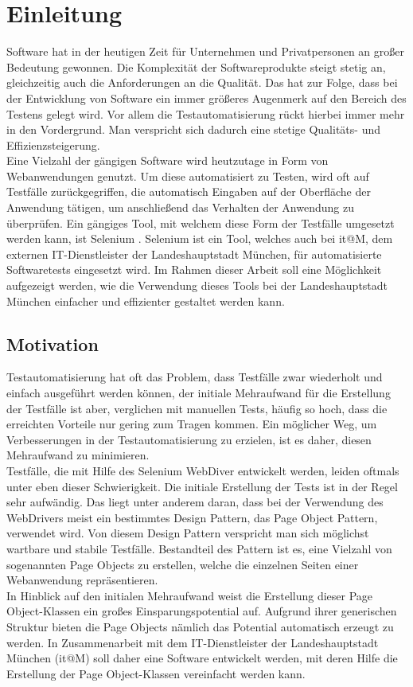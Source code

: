 \chapter{Einleitung}
\label{sec:einleitung}
Software hat in der heutigen Zeit für Unternehmen und Privatpersonen an großer Bedeutung gewonnen.
Die Komplexität der Softwareprodukte steigt stetig an, gleichzeitig auch die Anforderungen an die Qualität.
Das hat zur Folge, dass bei der Entwicklung von Software ein immer größeres Augenmerk auf den Bereich des Testens gelegt wird.
Vor allem die Testautomatisierung rückt hierbei immer mehr in den Vordergrund.
Man verspricht sich dadurch eine stetige Qualitäts- und Effizienzsteigerung.\\
Eine Vielzahl der gängigen Software wird heutzutage in Form von Webanwendungen genutzt.
Um diese automatisiert zu Testen, wird oft auf Testfälle zurückgegriffen, die automatisch Eingaben auf der Oberfläche der Anwendung tätigen, um anschließend das Verhalten der Anwendung zu überprüfen.
Ein gängiges Tool, mit welchem diese Form der Testfälle umgesetzt werden kann, ist Selenium \cite{selenium_selenium_2015}. Selenium ist ein Tool, welches auch bei it@M, dem externen IT-Dienstleister der Landeshauptstadt München, für automatisierte Softwaretests eingesetzt wird. Im Rahmen dieser Arbeit soll eine Möglichkeit aufgezeigt werden, wie die Verwendung dieses Tools bei der Landeshauptstadt München einfacher und effizienter gestaltet werden kann.
\\

\section{Motivation}
\label{sec:motivation}
Testautomatisierung hat oft das Problem, dass Testfälle zwar wiederholt und einfach ausgeführt werden können, der initiale Mehraufwand für die Erstellung der Testfälle ist aber, verglichen mit manuellen Tests, häufig so hoch, dass die erreichten Vorteile nur gering zum Tragen kommen. Ein möglicher Weg, um Verbesserungen in der Testautomatisierung zu erzielen, ist es daher, diesen Mehraufwand zu minimieren.\\
Testfälle, die mit Hilfe des Selenium WebDiver entwickelt werden, leiden oftmals unter eben dieser Schwierigkeit. Die initiale Erstellung der Tests ist in der Regel sehr aufwändig.
Das liegt unter anderem daran, dass bei der Verwendung des WebDrivers meist ein bestimmtes Design Pattern, das Page Object Pattern, verwendet wird. Von diesem Design Pattern verspricht man sich möglichst wartbare und stabile Testfälle.
Bestandteil des Pattern ist es, eine Vielzahl von sogenannten Page Objects zu erstellen, welche die einzelnen Seiten einer Webanwendung repräsentieren.\\
In Hinblick auf den initialen Mehraufwand weist die Erstellung dieser Page Object-Klassen ein großes Einsparungspotential auf. Aufgrund ihrer generischen Struktur bieten die Page Objects nämlich das Potential automatisch erzeugt zu werden.
In Zusammenarbeit mit dem IT-Dienstleister der Landeshauptstadt München (it@M) soll daher eine Software entwickelt werden, mit deren Hilfe die Erstellung der Page Object-Klassen vereinfacht werden kann.

